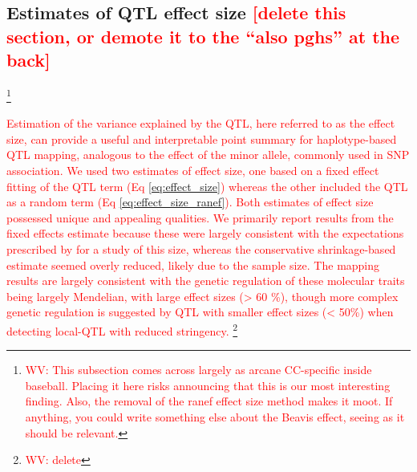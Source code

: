 \documentclass[9pt,twocolumn,twoside]{gsajnl}
\newcommand{\WV}[2]{\textcolor{red}{#1\footnote{\textcolor{red}{WV: #2}}}}
\newcommand{\WVinline}[1]{\textcolor{red}{#1}}
\begin{document}

\subsection{Estimates of QTL effect size \WVinline{[delete this section, or demote it to the ``also pghs'' at the back]}}

\WV{}{This subsection comes across largely as arcane CC-specific inside baseball. Placing it here risks announcing that this is our most interesting finding. Also, the removal of the ranef effect size method makes it moot. If anything, you could write something else about the Beavis effect, seeing as it should be relevant.}

\WV{Estimation of the variance explained by the QTL, here referred to as the effect size, can provide a useful and interpretable point summary for haplotype-based QTL mapping, analogous to the effect of the minor allele, commonly used in SNP association. We used two estimates of effect size, one based on a fixed effect fitting of the QTL term (Eq \ref{eq:effect_size}) whereas the other included the QTL as a random term (Eq \ref{eq:effect_size_ranef}). Both estimates of effect size possessed unique and appealing qualities. We primarily report results from the fixed effects estimate because these were largely consistent with the expectations prescribed by \cite{KeeleSPARCC} for a study of this size, whereas the conservative shrinkage-based estimate seemed overly reduced, likely due to the sample size. The mapping results are largely consistent with the genetic regulation of these molecular traits being largely Mendelian, with large effect sizes (> 60 \%), though more complex genetic regulation is suggested by QTL with smaller effect sizes (< 50\%) when detecting local-QTL with reduced stringency.
}{delete}
\end{document}
